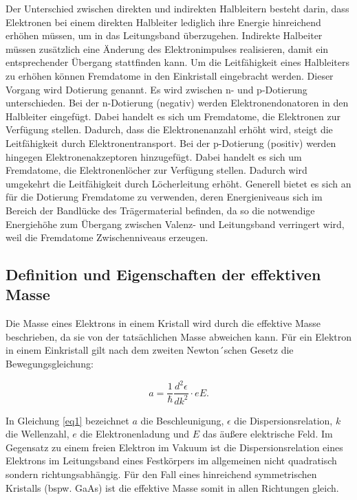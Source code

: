 Der Unterschied zwischen direkten und indirekten Halbleitern besteht darin, dass Elektronen 
bei einem direkten Halbleiter lediglich ihre Energie hinreichend erhöhen müssen, um in 
das Leitungsband überzugehen. Indirekte Halbeiter müssen zusätzlich eine Änderung 
des Elektronimpulses realisieren, damit ein entsprechender Übergang stattfinden kann.
Um die Leitfähigkeit eines Halbleiters zu erhöhen können Fremdatome in den Einkristall 
eingebracht werden. Dieser Vorgang wird Dotierung genannt.
Es wird zwischen n- und p-Dotierung unterschieden. Bei der n-Dotierung (negativ) werden 
Elektronendonatoren in den Halbleiter eingefügt. Dabei handelt es sich um Fremdatome, die
Elektronen zur Verfügung stellen. Dadurch, dass die Elektronenanzahl erhöht wird, 
steigt die Leitfähigkeit durch Elektronentransport.
Bei der p-Dotierung (positiv) werden hingegen Elektronenakzeptoren hinzugefügt. 
Dabei handelt es sich um Fremdatome, die Elektronenlöcher zur Verfügung stellen. 
Dadurch wird umgekehrt die Leitfähigkeit durch Löcherleitung erhöht. 
Generell bietet es sich an für die Dotierung Fremdatome zu verwenden, deren 
Energieniveaus sich im Bereich der Bandlücke des Trägermaterial befinden, da so die 
notwendige Energiehöhe zum Übergang zwischen Valenz- und Leitungsband verringert wird, 
weil die Fremdatome Zwischenniveaus erzeugen.

\subsection{Definition und Eigenschaften der effektiven Masse}
Die Masse eines Elektrons in einem Kristall wird durch die effektive Masse beschrieben, 
da sie von der tatsächlichen Masse abweichen kann. 
Für ein Elektron in einem Einkristall gilt nach dem zweiten Newton´schen Gesetz die 
Bewegungsgleichung:

\begin{equation}
    a = \frac{1}{\hbar} \frac{d^2\epsilon}{dk^2}\cdot eE.
    \label{eq1}
\end{equation}

In Gleichung \ref{eq1} bezeichnet $a$ die Beschleunigung, $\epsilon$ die 
Dispersionsrelation, $k$ die Wellenzahl, $e$ die Elektronenladung und $E$ das
äußere elektrische Feld.
Im Gegensatz zu einem freien Elektron im Vakuum ist die Dispersionsrelation eines 
Elektrons im Leitungsband eines Festkörpers im allgemeinen nicht quadratisch
sondern richtungsabhängig. Für den Fall eines hinreichend symmetrischen Kristalls
(bspw. GaAs) ist die effektive Masse somit in allen Richtungen gleich. 

